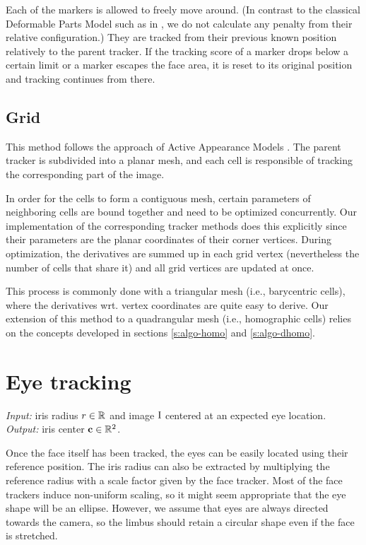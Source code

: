 Each of the markers is allowed to freely move around.
(In contrast to the classical Deformable Parts Model such as in \cite{uricar12}, we do not calculate any penalty from their relative configuration.)
They are tracked from their previous known position relatively to the parent tracker.
If the tracking score of a marker drops below a certain limit or a marker escapes the face area, it is reset to its original position and tracking continues from there.

\subsection{Grid}

This method follows the approach of Active Appearance Models \cite{cootes01}.
The parent tracker is subdivided into a planar mesh, and each cell is responsible of tracking the corresponding part of the image.

In order for the cells to form a contiguous mesh, certain parameters of neighboring cells are bound together and need to be optimized concurrently.
Our implementation of the corresponding tracker methods does this explicitly since their parameters are the planar coordinates of their corner vertices.
During optimization, the derivatives are summed up in each grid vertex (nevertheless the number of cells that share it) and all grid vertices are updated at once.

This process is commonly done with a triangular mesh (i.e., barycentric cells), where the derivatives wrt. vertex coordinates are quite easy to derive.
Our extension of this method to a quadrangular mesh (i.e., homographic cells) relies on the concepts developed in sections \ref{s:algo-homo} and \ref{s:algo-dhomo}.

\section{Eye tracking}

\textit{Input:} iris radius $r \in \mathbb{R}$ and image $\mathrm{I}$ centered at an expected eye location.\\
\textit{Output:} iris center $\mathbf{c} \in \mathbb{R}^2$.\\


Once the face itself has been tracked, the eyes can be easily located using their reference position.
The iris radius can also be extracted by multiplying the reference radius with a scale factor given by the face tracker.
Most of the face trackers induce non-uniform scaling, so it might seem appropriate that the eye shape will be an ellipse.
However, we assume that eyes are always directed towards the camera, so the limbus should retain a circular shape even if the face is stretched.

